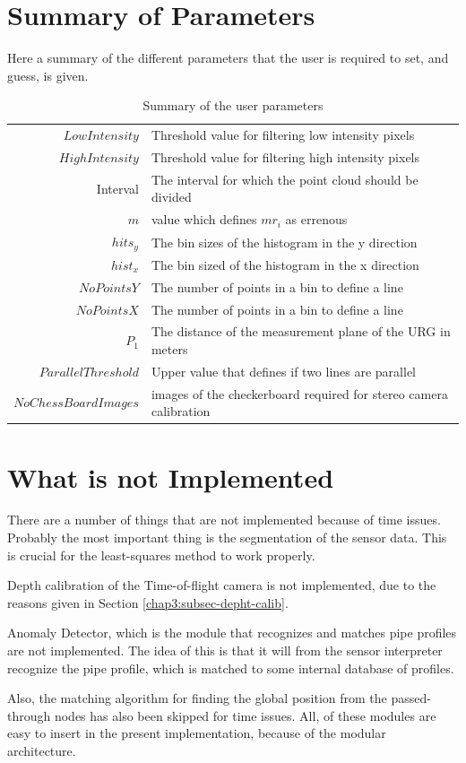 \section{Summary of Parameters}
Here a summary of the different parameters that the user is required to set, and guess, is
given. 
\begin{table}[htbp]
    \centering
    \begin{tabular}{|r|l|}
        \hline
        $LowIntensity$ &  Threshold value for filtering low intensity pixels   \\
        $HighIntensity$ & Threshold value for filtering high intensity pixels  \\
        Interval      &  The interval for which the point cloud should be divided \\
        $m$             &  value which defines $m r_i$ as errenous             \\
        \hline
        $hits_y$    &  The bin sizes of the histogram in the y direction       \\
        $hist_x$    &  The bin sized of the histogram in the x direction       \\
        $NoPointsY$ &  The number of points in a bin to define a line          \\
        $NoPointsX$ &  The number of points in a bin to define a line         \\
        $P_1$       &  The distance of the measurement plane of the URG in meters\\
        $ParallelThreshold$ &  Upper value that defines if two lines are parallel \\
        \hline
        $NoChessBoardImages$ & images of the checkerboard required for stereo camera calibration         \\
        \hline
    \end{tabular}
    \caption{Summary of the user parameters}
    \label{chap6:tab-user-parameters}
\end{table}

\section{What is not Implemented}
There are a number of things that are not implemented because of time issues. Probably the
most important thing is the segmentation of the sensor data. This is crucial for the
least-squares method to work properly. 

Depth calibration of the Time-of-flight camera is not implemented, due to the reasons
given in Section \ref{chap3:subsec-depht-calib}.

Anomaly Detector, which is the module that recognizes and matches pipe profiles are not implemented. 
The idea of this is that it will from the sensor interpreter recognize the pipe
profile, which is matched to some internal database of profiles.

Also, the matching algorithm for finding the global position from the passed-through nodes
has also been skipped for time issues. All, of these modules are easy to insert in the
present implementation, because of the modular architecture. 



